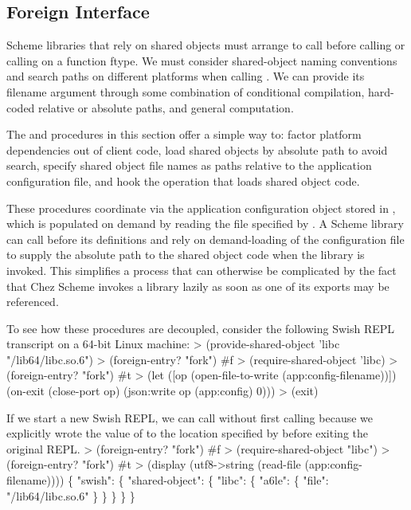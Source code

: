 \subsection{Foreign Interface}

Scheme libraries that rely on shared objects must arrange
to call  before calling  or
calling  on a function ftype.
We must consider shared-object naming conventions and search paths on
different platforms when calling .
We can provide its filename argument through some combination of conditional
compilation, hard-coded relative or absolute paths, and general computation.

The  and  procedures
in this section offer a simple way to:
factor platform dependencies out of client code,
load shared objects by absolute path to avoid search,
specify shared object file names as paths relative
to the application configuration file, and
hook the operation that loads shared object code.

These procedures coordinate via the application configuration object stored in
, which is populated on demand by reading the file specified
by .
A Scheme library can call  before its
 definitions and rely on demand-loading of the
configuration file to supply the absolute path to the shared object code when
the library is invoked.
This simplifies a process that can otherwise be complicated
by the fact that Chez Scheme invokes a library lazily as soon as
one of its exports may be referenced.

To see how these procedures are decoupled, consider the following Swish REPL
transcript on a 64-bit Linux machine:
\codebegin
> (provide-shared-object 'libc "/lib64/libc.so.6")
> (foreign-entry? "fork")
#f
> (require-shared-object 'libc)
> (foreign-entry? "fork")
#t
> (let ([op (open-file-to-write (app:config-filename))])
    (on-exit (close-port op)
      (json:write op (app:config) 0)))
> (exit)
\codeend

If we start a new Swish REPL, we can call 
without first calling 
because we explicitly wrote the value of  to the location
specified by  before exiting the original REPL.
\codebegin
> (foreign-entry? "fork")
#f
> (require-shared-object "libc")
> (foreign-entry? "fork")
#t
> (display (utf8->string (read-file (app:config-filename))))
\{
  "swish": \{
    "shared-object": \{
      "libc": \{
        "a6le": \{
          "file": "/lib64/libc.so.6"
        \}
      \}
    \}
  \}
\}
\codeend

